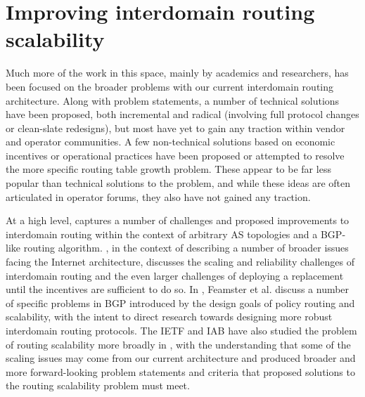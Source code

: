 \section{Improving interdomain routing scalability}

Much more of the work in this space, mainly by academics and researchers, has
been focused on the broader problems with our current interdomain routing
architecture. Along with problem statements, a number of technical solutions
have been proposed, both incremental and radical (involving full protocol
changes or clean-slate redesigns), but most have yet to gain any traction
within vendor and operator communities. A few non-technical solutions based on
economic incentives or operational practices have been proposed or attempted to
resolve the more specific routing table growth problem. These appear to be far
less popular than technical solutions to the problem, and while these ideas are
often articulated in operator forums, they also have not gained any traction.

At a high level, \cite{Yannuzzi:2005hc} captures a number of challenges and
proposed improvements to interdomain routing within the context of arbitrary AS
topologies and a BGP-like routing algorithm. \cite{Handley:2006kx}, in the
context of describing a number of broader issues facing the Internet
architecture, discusses the scaling and reliability challenges of interdomain
routing and the even larger challenges of deploying a replacement until the
incentives are sufficient to do so. In \cite{Feamster:2004nx}, Feamster et al.
discuss a number of specific problems in BGP introduced by the design goals of
policy routing and scalability, with the intent to direct research towards
designing more robust interdomain routing protocols. The IETF and IAB have also
studied the problem of routing scalability more broadly in \cite{rfc4984}, with
the understanding that some of the scaling issues may come from our current
architecture and produced broader and more forward-looking problem statements
and criteria that proposed solutions to the routing scalability problem must
meet.

